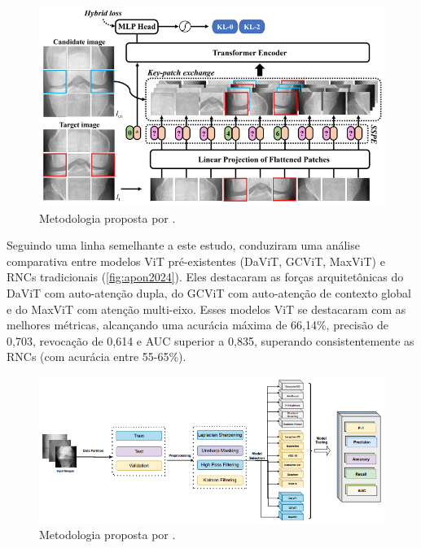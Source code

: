 \begin{figure}[!htbp]
    \centering
    \includegraphics[width=\textwidth]{figs/wang2024.png}
    \caption{Metodologia proposta por .}
    \label{fig:wang2024}
\end{figure}

Seguindo uma linha semelhante a este estudo,  conduziram uma análise comparativa entre modelos ViT pré-existentes (DaViT, GCViT, MaxViT) e RNCs tradicionais (\autoref{fig:apon2024}). Eles destacaram as forças arquitetônicas do DaViT com auto-atenção dupla, do GCViT com auto-atenção de contexto global e do MaxViT com atenção multi-eixo. Esses modelos ViT se destacaram com as melhores métricas, alcançando uma acurácia máxima de 66,14\%, precisão de 0,703, revocação de 0,614 e AUC superior a 0,835, superando consistentemente as RNCs (com acurácia entre 55-65\%).

\begin{figure}[!htbp]
    \centering
    \includegraphics[width=\textwidth]{figs/apon2024.png}
    \caption{Metodologia proposta por .}
    \label{fig:apon2024}
\end{figure}